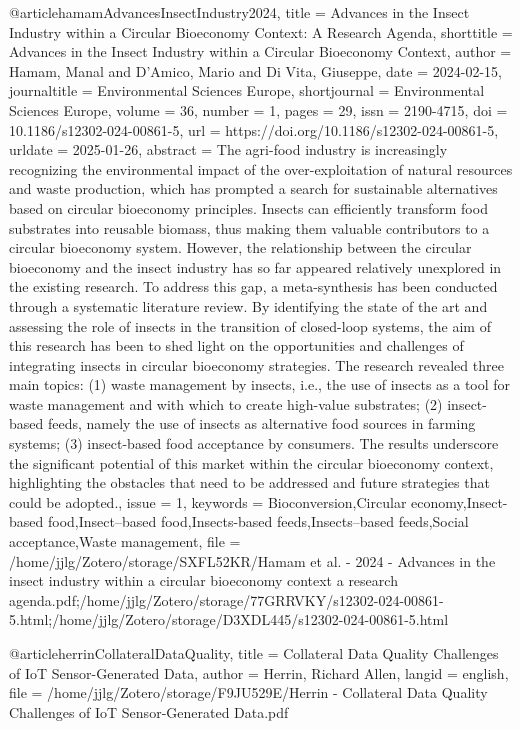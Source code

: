 {{{@article{hamamAdvancesInsectIndustry2024,
  title = {Advances in the Insect Industry within a Circular Bioeconomy Context: A Research Agenda},
  shorttitle = {Advances in the Insect Industry within a Circular Bioeconomy Context},
  author = {Hamam, Manal and D’Amico, Mario and Di Vita, Giuseppe},
  date = {2024-02-15},
  journaltitle = {Environmental Sciences Europe},
  shortjournal = {Environmental Sciences Europe},
  volume = {36},
  number = {1},
  pages = {29},
  issn = {2190-4715},
  doi = {10.1186/s12302-024-00861-5},
  url = {https://doi.org/10.1186/s12302-024-00861-5},
  urldate = {2025-01-26},
  abstract = {The agri-food industry is increasingly recognizing the environmental impact of the over-exploitation of natural resources and waste production, which has prompted a search for sustainable alternatives based on circular bioeconomy principles. Insects can efficiently transform food substrates into reusable biomass, thus making them valuable contributors to a circular bioeconomy system. However, the relationship between the circular bioeconomy and the insect industry has so far appeared relatively unexplored in the existing research. To address this gap, a meta-synthesis has been conducted through a systematic literature review. By identifying the state of the art and assessing the role of insects in the transition of closed-loop systems, the aim of this research has been to shed light on the opportunities and challenges of integrating insects in circular bioeconomy strategies. The research revealed three main topics: (1) waste management by insects, i.e., the use of insects as a tool for waste management and with which to create high-value substrates; (2) insect-based feeds, namely the use of insects as alternative food sources in farming systems; (3) insect-based food acceptance by consumers. The results underscore the significant potential of this market within the circular bioeconomy context, highlighting the obstacles that need to be addressed and future strategies that could be adopted.},
  issue = {1},
  keywords = {Bioconversion,Circular economy,Insect-based food,Insect–based food,Insects-based feeds,Insects–based feeds,Social acceptance,Waste management},
  file = {/home/jjlg/Zotero/storage/SXFL52KR/Hamam et al. - 2024 - Advances in the insect industry within a circular bioeconomy context a research agenda.pdf;/home/jjlg/Zotero/storage/77GRRVKY/s12302-024-00861-5.html;/home/jjlg/Zotero/storage/D3XDL445/s12302-024-00861-5.html}
}

@article{herrinCollateralDataQuality,
  title = {Collateral {{Data Quality Challenges}} of {{IoT Sensor-Generated Data}}},
  author = {Herrin, Richard Allen},
  langid = {english},
  file = {/home/jjlg/Zotero/storage/F9JU529E/Herrin - Collateral Data Quality Challenges of IoT Sensor-Generated Data.pdf}
}

}}}
